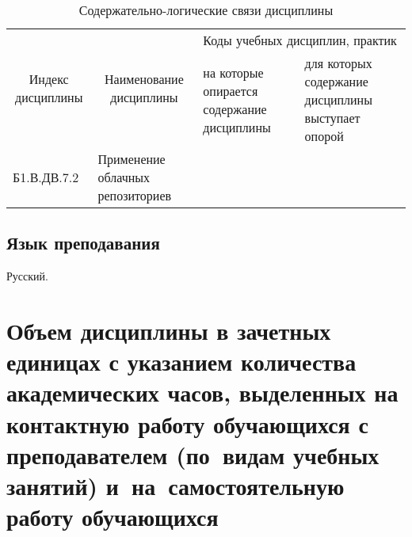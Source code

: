 \documentclass[a4paper,12pt]{article}
\begin{document}
  \begin{table}[H]
  \setlength\arraycolsep{3pt}
  \caption{Содержательно-логические связи дисциплины}
  \begin{tabular}{|l|p{18ex}|*{2}{p{23ex}|}}
  \hline
  \multicolumn{1}{|c|}{\multirow{2}{13ex}{\centering Индекс \linebreak дисциплины}} &
  \multicolumn{1}{c|}{\multirow{2}{18ex}{\centering Наименование \linebreak дисциплины}} & 
  \multicolumn{2}{p{46ex}|}{\centering Коды учебных дисциплин, практик} \\
  \cline{3-4}
   & & 
  \centering на которые опирается содержание дисциплины & 
  \centering\arraybackslash для которых содержание дисциплины выступает опорой
  \\ \hline
  Б1.В.ДВ.7.2 & Применение облачных репозиториев &  & 
  \\ \hline
  \end{tabular}
  \end{table}

\subsection{Язык преподавания} 

  Русский.

\newpage

\section{Объем дисциплины в зачетных единицах с указанием количества академических часов, выделенных на контактную работу обучающихся с преподавателем (по~видам учебных занятий) и~на~самостоятельную работу обучающихся}
\end{document}
